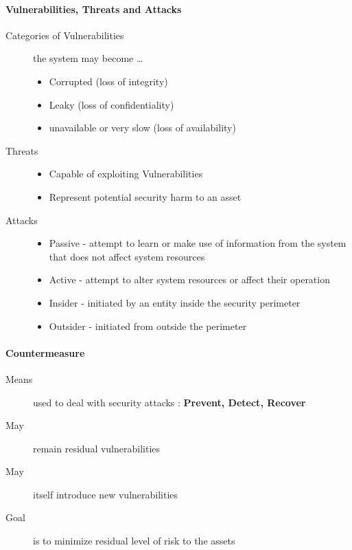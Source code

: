 \documentclass{article}
\begin{document}
            \paragraph{Vulnerabilities, Threats and Attacks}
                    \begin{description}
                        \item[Categories of Vulnerabilities] the system may become \dots 
                            \begin{itemize}
                                \item Corrupted (loss of integrity)
                                \item Leaky (loss of confidentiality)
                                \item unavailable or very slow (loss of availability)
                            \end{itemize}
                        \item[Threats]
                            \begin{itemize}
                                \item Capable of exploiting Vulnerabilities
                                \item Represent potential security harm to an asset 
                            \end{itemize}
                        \item[Attacks] 
                            \begin{itemize}
                                \item Passive -\> attempt to learn or make use of information from the system that does not affect system resources
                                \item Active -\> attempt to alter system resources or affect their operation
                                \item Insider -\> initiated by an entity inside the security perimeter
                                \item Outsider -\> initiated from outside the perimeter
                            \end{itemize}
                    \end{description}

                    \paragraph{Countermeasure}
                            \begin{description}
                                \item[Means] used to deal with security attacks : \textbf{Prevent, Detect, Recover}
                                 \item [May] remain residual vulnerabilities
                                 \item [May] itself introduce new vulnerabilities 
                                 \item [Goal] is to minimize residual level of risk to the assets    
                            \end{description}
\end{document}
